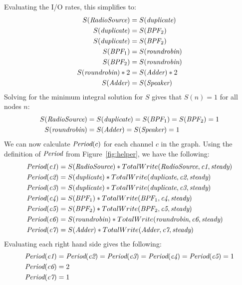Evaluating the I/O rates, this simplifies to:
\begin{align*}
S(\mbox{\it RadioSource}) &= S(\mbox{\it duplicate}) \\
S(\mbox{\it duplicate})  &= S(\mbox{\it BPF}_2) \\
S(\mbox{\it duplicate})  &= S(\mbox{\it BPF}_2) \\
S(\mbox{\it BPF}_1) &= S(\mbox{\it roundrobin}) \\
S(\mbox{\it BPF}_2) &= S(\mbox{\it roundrobin}) \\
S(\mbox{\it roundrobin}) * 2 &= S(\mbox{\it Adder}) * 2 \\
S(\mbox{\it Adder}) &= S(\mbox{\it Speaker})
\end{align*}
Solving for the minimum integral solution for $S$ gives that $S(n) = 1$ for all nodes $n$:
\begin{align*}
S(\mbox{\it RadioSource}) &= S(\mbox{\it duplicate}) = S(\mbox{\it BPF}_1) = S(\mbox{\it BPF}_2) = 1 \\
S(\mbox{\it roundrobin}) &= S(\mbox{\it Adder}) = S(\mbox{\it Speaker}) = 1
\end{align*}
We can now calculate $\mbox{\it Period}(c)$ for each channel $c$ in the
graph.  Using the definition of $\mbox{\it Period}$ from
Figure~\ref{fig:helper}, we have the following:
\begin{align*}
\mbox{\it Period}(\mbox{\it c1}) &= S(\mbox{\it RadioSource}) * TotalWrite(\mbox{\it RadioSource}, \mbox{\it c1}, \mbox{\it steady}) \\
\mbox{\it Period}(\mbox{\it c2}) &= S(\mbox{\it duplicate}) * TotalWrite(\mbox{\it duplicate}, \mbox{\it c2}, \mbox{\it steady}) \\
\mbox{\it Period}(\mbox{\it c3}) &= S(\mbox{\it duplicate}) * TotalWrite(\mbox{\it duplicate}, \mbox{\it c3}, \mbox{\it steady}) \\
\mbox{\it Period}(\mbox{\it c4}) &= S(\mbox{\it BPF}_1) * TotalWrite(\mbox{\it BPF}_1, \mbox{\it c4}, \mbox{\it steady}) \\
\mbox{\it Period}(\mbox{\it c5}) &= S(\mbox{\it BPF}_2) * TotalWrite(\mbox{\it BPF}_2, \mbox{\it c5}, \mbox{\it steady}) \\
\mbox{\it Period}(\mbox{\it c6}) &= S(\mbox{\it roundrobin}) * TotalWrite(\mbox{\it roundrobin}, \mbox{\it c6}, \mbox{\it steady}) \\
\mbox{\it Period}(\mbox{\it c7}) &= S(\mbox{\it Adder}) * TotalWrite(\mbox{\it Adder}, \mbox{\it c7}, \mbox{\it steady})
\end{align*}
Evaluating each right hand side gives the following:
\begin{align*}
\mbox{\it Period}(\mbox{\it c1}) &= \mbox{\it Period}(\mbox{\it c2}) = \mbox{\it Period}(\mbox{\it c3}) = \mbox{\it Period}(\mbox{\it c4}) = \mbox{\it Period}(\mbox{\it c5}) = 1 \\
\mbox{\it Period}(\mbox{\it c6}) &= 2 \\
\mbox{\it Period}(\mbox{\it c7}) &= 1 
\end{align*}


